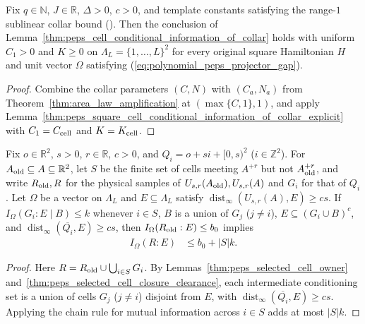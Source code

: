 \begin{lemma}
    \label{thm:peps_square_cell_conditional_information_of_collar}
    \leanok
    Fix $q\in\mathbb N$, $J\in\mathbb R$, $\Delta>0$, $c>0$, and template constants satisfying the range-$1$ sublinear collar bound (\cite{gap:polypeps_angular_annular_geometry_scope}).
    Then the conclusion of Lemma~\ref{thm:peps_cell_conditional_information_of_collar} holds with uniform $C_1>0$ and $K\ge0$ on $\Lambda_L=\{1,\ldots,L\}^2$ for every original square Hamiltonian $H$ and unit vector $\Omega$ satisfying (\ref{eq:polynomial_peps_projector_gap}).
\end{lemma}
\begin{proof}\leanok
    Combine the collar parameters $(C,N)$ with $(C_a,N_a)$ from
    Theorem~\ref{thm:area_law_amplification} at $(\max\{C,1\},1)$, and apply
    Lemma~\ref{thm:peps_square_cell_conditional_information_of_collar_explicit} with $C_1=C_{\rm cell}$ and $K=K_{\rm cell}$.
\end{proof}

\begin{lemma}
    \label{thm:peps_selected_region_information_of_cell_bounds}
    \leanok
    Fix $o\in\mathbb R^2$, $s>0$, $r\in\mathbb R$, $c>0$, and $Q_i=o+si+[0,s)^2$ ($i\in\mathbb Z^2$).
    For $A_{\rm old}\subseteq A\subseteq\mathbb R^2$, let $S$ be the finite set of cells meeting $A^{+r}$ but not $A_{\rm old}^{+r}$, and write $R_{\rm old},R$ for the physical samples of $U_{s,r}(A_{\rm old}),U_{s,r}(A)$ and $G_i$ for that of $Q_i$.
    Let $\Omega$ be a vector on $\Lambda_L$ and $E\subseteq\Lambda_L$ satisfy $\operatorname{dist}_\infty(U_{s,r}(A),E)\ge cs$.
    If $I_\Omega(G_i:E\mid B)\le k$ whenever $i\in S$, $B$ is a union of $G_j$ ($j\ne i$), $E\subseteq(G_i\cup B)^c$, and $\operatorname{dist}_\infty(\overline{Q_i},E)\ge cs$, then $I_\Omega(R_{\rm old}:E)\le b_0$ implies
    \begin{align}
        I_\Omega(R:E) & \le b_0+|S|k.
        \label{eq:peps_selected_region_information}
    \end{align}
\end{lemma}
\begin{proof}\leanok
    Here $R=R_{\rm old}\cup\bigcup_{i\in S}G_i$. By Lemmas~\ref{thm:peps_selected_cell_owner} and~\ref{thm:peps_selected_cell_closure_clearance}, each intermediate conditioning set is a union of cells $G_j$ ($j\ne i$) disjoint from $E$, with $\operatorname{dist}_\infty(\overline{Q_i},E)\ge cs$. Applying the chain rule for mutual information across $i\in S$ adds at most $|S|k$.
\end{proof}

